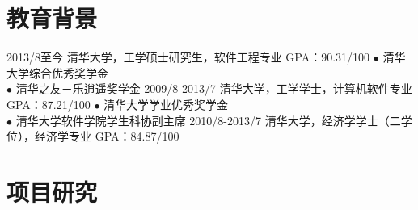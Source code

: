 \documentclass[]{friggeri-cv-cn}
\begin{document}


\section{教育背景}

\begin{entrylist}
  \entry
    {2013/8至今}
    {清华大学，工学硕士研究生，软件工程专业}
    {GPA：90.31/100}
    {
    $\bullet$ 清华大学综合优秀奖学金 \\
    $\bullet$ 清华之友－乐逍遥奖学金
    }
  \entry
    {2009/8-2013/7}
    {清华大学，工学学士，计算机软件专业}
    {GPA：87.21/100}
    {
    $\bullet$ 清华大学学业优秀奖学金\\
    $\bullet$ 清华大学软件学院学生科协副主席
    }
  \entry
    {2010/8-2013/7}
    {清华大学，经济学学士（二学位），经济学专业}
    {GPA：84.87/100}
    { }
\end{entrylist}

\section{项目研究}
\end{document}
